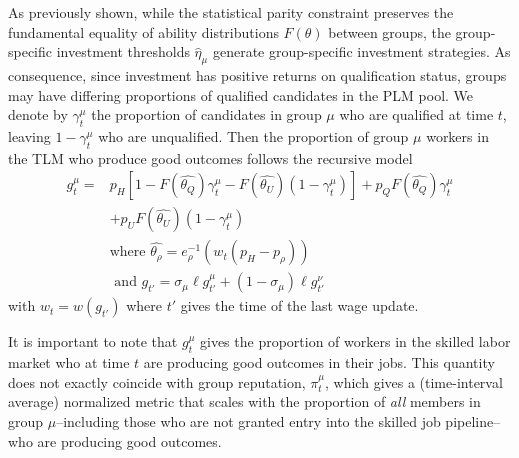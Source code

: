 \documentclass[sigconf]{acmart}
\newtheorem{prop}{Proposition}
\theoremstyle{definition}
\begin{document}
As previously shown, while the statistical parity constraint preserves the fundamental equality of ability distributions $F(\theta)$ between groups, the group-specific investment thresholds $\widehat{\eta}_\mu$ generate group-specific investment strategies. As consequence, since investment has positive returns on qualification status, groups may have differing proportions of qualified candidates in the PLM pool. We denote by $\gamma^\mu_t$ the proportion of candidates in group $\mu$ who are qualified at time $t$, leaving $1-\gamma^\mu_t$ who are unqualified. Then the proportion of group $\mu$ workers in the TLM who produce good outcomes follows the recursive model
\begin{align}
{g^\mu_{t}} = & p_H[1-F(\widehat{\theta_Q})\gamma^\mu_t-F(\widehat{\theta_U})(1-\gamma^\mu_t)]+ p_{Q}F(\widehat{\theta_Q})\gamma^\mu_t \label{sseq}
\\
&+p_{U}F(\widehat{\theta_U})(1-\gamma^\mu_t) \nonumber
\\
&\text{where } \widehat{\theta_\rho} = e_\rho^{-1}(w_t(p_H - p_{\rho})) \nonumber
\\
& \text{ and } g_{t'} = \sigma_\mu \ell g^\mu_{t'} + (1-\sigma_\mu)\ell g^\nu_{t'} \nonumber
\end{align}
with $w_t = w(g_{t'})$ where $t'$ gives the time of the last wage update.



It is important to note that $g^\mu_t$ gives the proportion of workers in the skilled labor market who at time $t$ are producing good outcomes in their jobs. This quantity does not exactly coincide with group reputation, $\pi^\mu_t$, which gives a (time-interval average) normalized metric that scales with the proportion of \textit{all} members in group $\mu$--including those who are not granted entry into the skilled job pipeline--who are producing good outcomes. 
\end{document}

